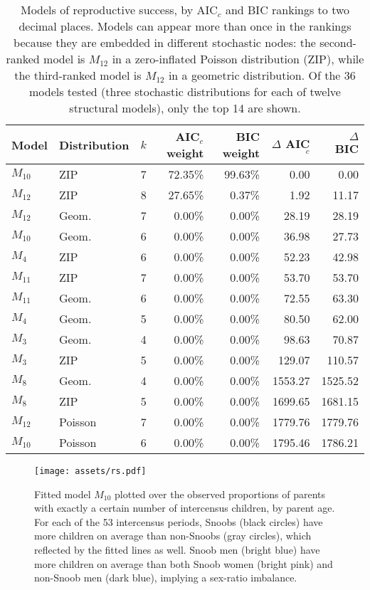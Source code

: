 \documentclass[11pt]{article}
\begin{document}
\begin{table}[htbp]
  \centering
    \begin{tabular}{llrrrrr}
    \hline
    \hline
    Model & Distribution & $k$ & AIC$_c$ weight & BIC weight & $\Delta$ AIC$_c$ & $\Delta$ BIC \\
    \hline
    $M_{10}$ & ZIP   & 7     & 72.35\% & 99.63\% & 0.00  & 0.00 \\
    $M_{12}$ & ZIP   & 8     & 27.65\% & 0.37\% & 1.92  & 11.17 \\
    $M_{12}$ & Geom. & 7     & 0.00\% & 0.00\% & 28.19 & 28.19 \\
    $M_{10}$ & Geom. & 6     & 0.00\% & 0.00\% & 36.98 & 27.73 \\
    $M_4$  & ZIP   & 6     & 0.00\% & 0.00\% & 52.23 & 42.98 \\
    $M_{11}$ & ZIP   & 7     & 0.00\% & 0.00\% & 53.70 & 53.70 \\
    $M_{11}$ & Geom. & 6     & 0.00\% & 0.00\% & 72.55 & 63.30 \\
    $M_{4}$ & Geom. & 5     & 0.00\% & 0.00\% & 80.50 & 62.00 \\
    $M_3$  & Geom. & 4     & 0.00\% & 0.00\% & 98.63 & 70.87 \\
    $M_3$  & ZIP   & 5     & 0.00\% & 0.00\% & 129.07 & 110.57 \\
    $M_8$  & Geom. & 4     & 0.00\% & 0.00\% & 1553.27 & 1525.52 \\
    $M_8$  & ZIP   & 5     & 0.00\% & 0.00\% & 1699.65 & 1681.15 \\
    $M_{12}$ & Poisson & 7     & 0.00\% & 0.00\% & 1779.76 & 1779.76 \\
    $M_{10}$ & Poisson & 6     & 0.00\% & 0.00\% & 1795.46 & 1786.21 \\
    \hline
    \end{tabular}%
    \caption{Models of reproductive success, by AIC$_c$ and BIC rankings to two decimal places.  Models can appear more than once in the rankings because they are embedded in different stochastic nodes: the second-ranked model is $M_{12}$ in a zero-inflated Poisson distribution (ZIP), while the third-ranked model is $M_{12}$ in a geometric distribution.  Of the 36 models tested (three stochastic distributions for each of twelve structural models), only the top 14 are shown.}
  \label{tab:RScompare}%
\end{table}%


\begin{figure}[t]
\begin{center}
\texttt{[image: assets/rs.pdf]}
\caption{Fitted model $M_{10}$ plotted over the observed proportions of parents with exactly a certain number of intercensus children, by parent age.  For each of the 53 intercensus periods, Snoobs (black circles) have more children on average than non-Snoobs (gray circles), which reflected by the fitted lines as well.  Snoob men (bright blue) have more children on average than both Snoob women (bright pink) and non-Snoob men (dark blue), implying a sex-ratio imbalance.}
\label{fig:rs}
\end{center}
\end{figure}
\end{document}
